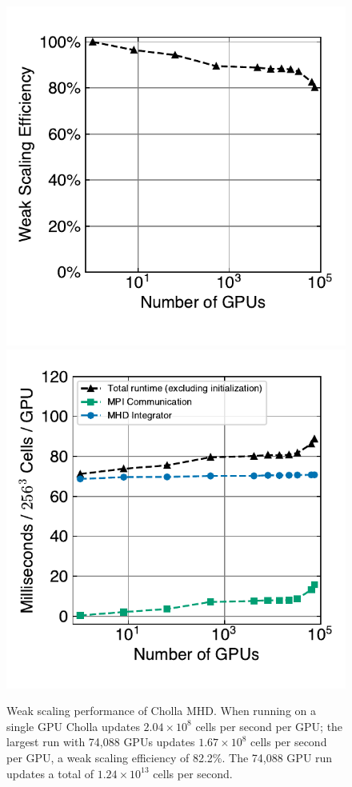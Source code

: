 \documentclass[modern, linenumbers]{aastex631}
\newcommand*{\img}[1]{%
    \raisebox{-.05\baselineskip}{%
        \texttt{[image: \#1]}%
    }%
}
\begin{document}
\begin{figure}[ht!]
    \includegraphics[width=0.5\linewidth]{scaling_tests_weak_efficiency.pdf}
    \includegraphics[width=0.5\linewidth]{scaling_tests_ms_per_gpu.pdf}
    \caption{Weak scaling performance of Cholla MHD. When running on a single GPU Cholla updates $2.04\times10^8$ cells per second per GPU; the largest run with 74,088 GPUs updates $1.67\times10^8$ cells per second per GPU, a weak scaling efficiency of 82.2\%. The 74,088 GPU run updates a total of $1.24\times10^{13}$ cells per second. \href{https://zenodo.org/records/10927223}{\img{zenodo-gradient-200.png}}}
    \label{fig:scaling-weak-efficiency}
\end{figure}
\end{document}
